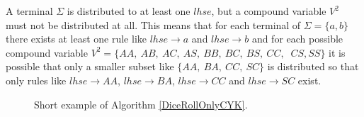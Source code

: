 \noindent
{}
A terminal $\Sigma$ is distributed to at least one $lhse$, but a compound variable $V^2$ must not be distributed at all. This means that for each terminal of $\Sigma=\{a,b\}$ there exists at least one rule like $lhse\rightarrow a$ and $lhse\rightarrow b$ and for each possible compound variable $V^2=\{AA,~AB,~AC,~AS,~BB,~BC,~BS,~CC,$ $~CS,SS\}$ it is possible that only a smaller subset like $\{AA,~BA,~CC,~SC\}$ is distributed so that only rules like $lhse\rightarrow AA$, $lhse\rightarrow BA$, $lhse\rightarrow CC$ and $lhse\rightarrow SC$ exist.
\noindent
\begin{figure} [h]
	\begin{minipage}{6in}
		\centering
	\end{minipage}
	\caption{Short example of Algorithm \ref{DiceRollOnlyCYK}.}
	\label{DiceRollONlyCYKExample}
\end{figure}
\pagebreak
